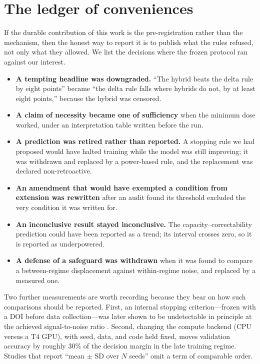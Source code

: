 \documentclass[jou,11pt,donotrepeattitle]{apa7}
\begin{document}
\section{The ledger of conveniences}

If the durable contribution of this work is the pre-registration rather than the mechanism,
then the honest way to report it is to publish what the rules refused, not only what they
allowed. We list the decisions where the frozen protocol ran against our interest.

\begin{itemize}
  \item \textbf{A tempting headline was downgraded.} ``The hybrid beats the delta rule by eight
        points'' became ``the delta rule falls where hybrids do not, by at least eight points,''
        because the hybrid was censored.
  \item \textbf{A claim of necessity became one of sufficiency} when the minimum dose worked,
        under an interpretation table written before the run.
  \item \textbf{A prediction was retired rather than reported.} A stopping rule we had proposed
        would have halted training while the model was still improving; it was withdrawn and
        replaced by a power-based rule, and the replacement was declared non-retroactive.
  \item \textbf{An amendment that would have exempted a condition from extension was rewritten}
        after an audit found its threshold excluded the very condition it was written for.
  \item \textbf{An inconclusive result stayed inconclusive.} The capacity--correctability
        prediction could have been reported as a trend; its interval crosses zero, so it is
        reported as underpowered.
  \item \textbf{A defense of a safeguard was withdrawn} when it was found to compare a
        between-regime displacement against within-regime noise, and replaced by a measured
        one.
\end{itemize}

Two further measurements are worth recording because they bear on how such comparisons should
be reported. First, an internal stopping criterion---frozen with a DOI before data
collection---was later shown to be undetectable in principle at the achieved signal-to-noise
ratio \parencite{speranza2026stopping}. Second, changing the compute backend (CPU versus a T4
GPU), with seed, data, and code held fixed, moves validation accuracy by roughly $30\%$ of the
decision margin in the late training regime. Studies that report ``mean $\pm$ SD over $N$
seeds'' omit a term of comparable order.
\end{document}
